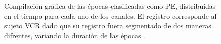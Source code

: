 \begin{figure}
\centering
{}\\
\\
\caption{Compilaci\'on gr\'afica de las \'epocas clasificadas como PE, distribuidas en el tiempo
para cada uno de los canales. El registro corresponde al sujeto VCR dado que su registro fuera
segmentado de dos maneras difrentes, variando la duraci\'on de las \'epocas.}
\label{comp_VCR}
\end{figure}



